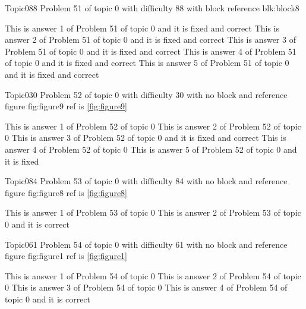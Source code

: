 \documentclass[master]{exam}
\begin{document}
\begin{problem}[requires=blk:block8]{Topic0}{88}
	Problem 51 of topic 0 with difficulty 88 with block reference blk:block8
	\begin{answers}
		 This is answer 1 of Problem 51 of topic 0 and it is fixed and correct
		 This is answer 2 of Problem 51 of topic 0 and it is fixed and correct
		 This is answer 3 of Problem 51 of topic 0 and it is fixed and correct
		 This is answer 4 of Problem 51 of topic 0 and it is fixed and correct
		 This is answer 5 of Problem 51 of topic 0 and it is fixed and correct
	\end{answers}
\end{problem}

\begin{problem}{Topic0}{30}
	Problem 52 of topic 0 with difficulty 30 with no block and reference figure fig:figure9 ref is \ref{fig:figure9}
	\begin{answers}
		\answer This is answer 1 of Problem 52 of topic 0 
		\answer This is answer 2 of Problem 52 of topic 0 
		 This is answer 3 of Problem 52 of topic 0 and it is fixed and correct
		\answer This is answer 4 of Problem 52 of topic 0 
		\answer[fixed] This is answer 5 of Problem 52 of topic 0 and it is fixed
	\end{answers}
\end{problem}

\begin{problem}{Topic0}{84}
	Problem 53 of topic 0 with difficulty 84 with no block and reference figure fig:figure8 ref is \ref{fig:figure8}
	\begin{answers}
		\answer This is answer 1 of Problem 53 of topic 0 
		\answer[correct] This is answer 2 of Problem 53 of topic 0 and it is correct
	\end{answers}
\end{problem}

\begin{problem}{Topic0}{61}
	Problem 54 of topic 0 with difficulty 61 with no block and reference figure fig:figure1 ref is \ref{fig:figure1}
	\begin{answers}
		\answer This is answer 1 of Problem 54 of topic 0 
		\answer This is answer 2 of Problem 54 of topic 0 
		\answer This is answer 3 of Problem 54 of topic 0 
		\answer[correct] This is answer 4 of Problem 54 of topic 0 and it is correct
	\end{answers}
\end{problem}
\end{document}

